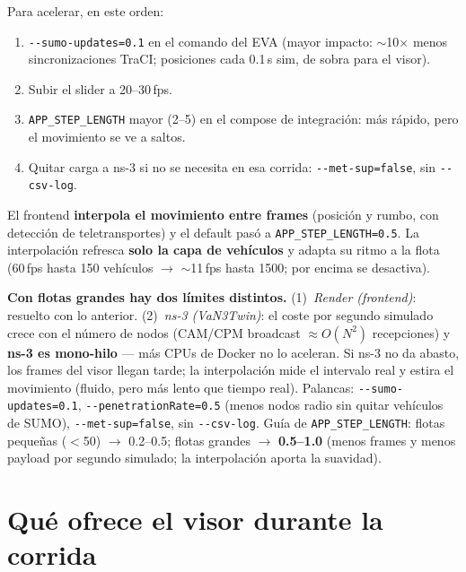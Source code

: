 \documentclass[11pt,a4paper]{article}
\begin{document}
Para acelerar, en este orden:

\begin{enumerate}[leftmargin=1.6em, itemsep=2pt]
  \item \texttt{-{}-sumo-updates=0.1} en el comando del EVA (mayor impacto:
        $\sim$10$\times$ menos sincronizaciones TraCI; posiciones cada
        0.1\,s sim, de sobra para el visor).
  \item Subir el slider a 20--30\,fps.
  \item \texttt{APP\_STEP\_LENGTH} mayor (2--5) en el compose de integración:
        más rápido, pero el movimiento se ve a saltos.
  \item Quitar carga a ns-3 si no se necesita en esa corrida:
        \texttt{-{}-met-sup=false}, sin \texttt{-{}-csv-log}.
\end{enumerate}

\begin{notabox}
El frontend \textbf{interpola el movimiento entre frames} (posición y rumbo,
con detección de teletransportes) y el default pasó a
\texttt{APP\_STEP\_LENGTH=0.5}. La interpolación refresca \textbf{solo la capa
de vehículos} y adapta su ritmo a la flota (60\,fps hasta 150 vehículos
$\rightarrow$ $\sim$11\,fps hasta 1500; por encima se desactiva).
\end{notabox}

\begin{advertenciabox}
\textbf{Con flotas grandes hay dos límites distintos.} (1)~\emph{Render
(frontend)}: resuelto con lo anterior. (2)~\emph{ns-3 (VaN3Twin)}: el coste
por segundo simulado crece con el número de nodos (CAM/CPM broadcast
$\approx O(N^2)$ recepciones) y \textbf{ns-3 es mono-hilo} --- más CPUs de
Docker no lo aceleran. Si ns-3 no da abasto, los frames del visor llegan
tarde; la interpolación mide el intervalo real y estira el movimiento
(fluido, pero más lento que tiempo real). Palancas:
\texttt{-{}-sumo-updates=0.1}, \texttt{-{}-penetrationRate=0.5} (menos nodos
radio sin quitar vehículos de SUMO), \texttt{-{}-met-sup=false}, sin
\texttt{-{}-csv-log}. Guía de \texttt{APP\_STEP\_LENGTH}: flotas pequeñas
($<$50) $\rightarrow$ 0.2--0.5; flotas grandes $\rightarrow$
\textbf{0.5--1.0} (menos frames y menos payload por segundo simulado; la
interpolación aporta la suavidad).
\end{advertenciabox}

\section{Qué ofrece el visor durante la corrida}
\end{document}
